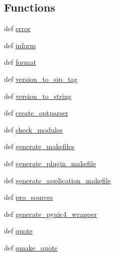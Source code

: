 \subsection*{Functions}
\begin{DoxyCompactItemize}
\item 
def \hyperlink{namespacePyQt-x11-gpl-4_811_82_1_1configure-ng_a825f441f79b982a7afa24bc919a8746f}{error}
\item 
def \hyperlink{namespacePyQt-x11-gpl-4_811_82_1_1configure-ng_afba18e7664257afca206de2812cd3c35}{inform}
\item 
def \hyperlink{namespacePyQt-x11-gpl-4_811_82_1_1configure-ng_ad7c14d59520ae295e8f00d1e7c1a93f9}{format}
\item 
def \hyperlink{namespacePyQt-x11-gpl-4_811_82_1_1configure-ng_a76806d4a4438a757595fddcf767087b5}{version\+\_\+to\+\_\+sip\+\_\+tag}
\item 
def \hyperlink{namespacePyQt-x11-gpl-4_811_82_1_1configure-ng_a657a83b4b6b7d204026d8886e25b7239}{version\+\_\+to\+\_\+string}
\item 
def \hyperlink{namespacePyQt-x11-gpl-4_811_82_1_1configure-ng_addd321fb67ee0b54293991debea2d501}{create\+\_\+optparser}
\item 
def \hyperlink{namespacePyQt-x11-gpl-4_811_82_1_1configure-ng_ac1defbbcbca22982a3ea8d8b2a21de13}{check\+\_\+modules}
\item 
def \hyperlink{namespacePyQt-x11-gpl-4_811_82_1_1configure-ng_a74273eeb167d7be2a13363e9374f5b4b}{generate\+\_\+makefiles}
\item 
def \hyperlink{namespacePyQt-x11-gpl-4_811_82_1_1configure-ng_ad9303b54272cf0f9eed2c14c5e4e60b6}{generate\+\_\+plugin\+\_\+makefile}
\item 
def \hyperlink{namespacePyQt-x11-gpl-4_811_82_1_1configure-ng_a476728d65d3361170cbed02efeffb1ce}{generate\+\_\+application\+\_\+makefile}
\item 
def \hyperlink{namespacePyQt-x11-gpl-4_811_82_1_1configure-ng_ae7c41ad989a082b794810e68712d36c0}{pro\+\_\+sources}
\item 
def \hyperlink{namespacePyQt-x11-gpl-4_811_82_1_1configure-ng_a2b570c63626d1d7123eab8d69187e5ae}{generate\+\_\+pyuic4\+\_\+wrapper}
\item 
def \hyperlink{namespacePyQt-x11-gpl-4_811_82_1_1configure-ng_a7473c4ca4d59a8b58add7fb4eb35b3fa}{quote}
\item 
def \hyperlink{namespacePyQt-x11-gpl-4_811_82_1_1configure-ng_aa0bb0f1abeff584655057450f38e0b1a}{qmake\+\_\+quote}
\item 

\end{DoxyCompactItemize}
